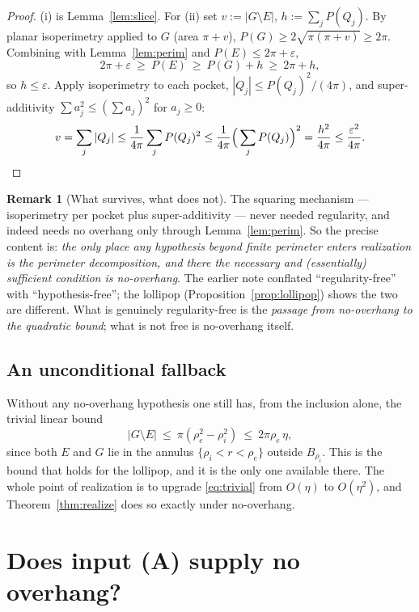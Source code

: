\documentclass[11pt]{article}
\theoremstyle{definition}
\newtheorem{remark}[theorem]{Remark}
\newcommand{\eps}{\varepsilon}
\newcommand{\abs}[1]{\left|#1\right|}
\begin{document}
\begin{proof}
(i) is Lemma~\ref{lem:slice}. For (ii) set $v:=|G\setminus E|$,
$h:=\sum_jP(Q_j)$. By planar isoperimetry applied to $G$ (area $\pi+v$),
$P(G)\ge 2\sqrt{\pi(\pi+v)}\ge2\pi$. Combining with
Lemma~\ref{lem:perim} and $P(E)\le2\pi+\eps$,
\[
   2\pi+\eps\ \ge\ P(E)\ \ge\ P(G)+h\ \ge\ 2\pi+h,
\]
so $h\le\eps$. Apply isoperimetry to each pocket, $|Q_j|\le
P(Q_j)^2/(4\pi)$, and super-additivity $\sum a_j^2\le(\sum a_j)^2$ for
$a_j\ge0$:
\[
   v=\sum_j|Q_j|\le\frac1{4\pi}\sum_jP(Q_j)^2
   \le\frac1{4\pi}\Big(\sum_jP(Q_j)\Big)^2=\frac{h^2}{4\pi}
   \le\frac{\eps^2}{4\pi}. \qedhere
\]
\end{proof}

\begin{remark}[What survives, what does not]\label{rem:survives}
The squaring mechanism --- isoperimetry per pocket plus super-additivity ---
never needed regularity, and indeed needs no overhang only through
Lemma~\ref{lem:perim}. So the precise content is: \emph{the only place any
hypothesis beyond finite perimeter enters realization is the perimeter
decomposition, and there the necessary and (essentially) sufficient
condition is no-overhang}. The earlier note conflated ``regularity-free''
with ``hypothesis-free''; the lollipop (Proposition~\ref{prop:lollipop})
shows the two are different. What is genuinely regularity-free is the
\emph{passage from no-overhang to the quadratic bound}; what is not free
is no-overhang itself.
\end{remark}

\subsection*{An unconditional fallback}

Without any no-overhang hypothesis one still has, from the inclusion alone,
the trivial linear bound
\begin{equation}\label{eq:trivial}
   \abs{G\setminus E}\ \le\ \pi(\rho_e^2-\rho_i^2)\ \le\ 2\pi\rho_e\,\eta ,
\end{equation}
since both $E$ and $G$ lie in the annulus $\{\rho_i<r<\rho_e\}$ outside
$B_{\rho_i}$. This is the bound that holds for the lollipop, and it is the
only one available there. The whole point of realization is to upgrade
\eqref{eq:trivial} from $O(\eta)$ to $O(\eta^2)$, and
Theorem~\ref{thm:realize} does so exactly under no-overhang.

\section{Does input (A) supply no overhang?}
\label{sec:Agivesnoov}
\end{document}
